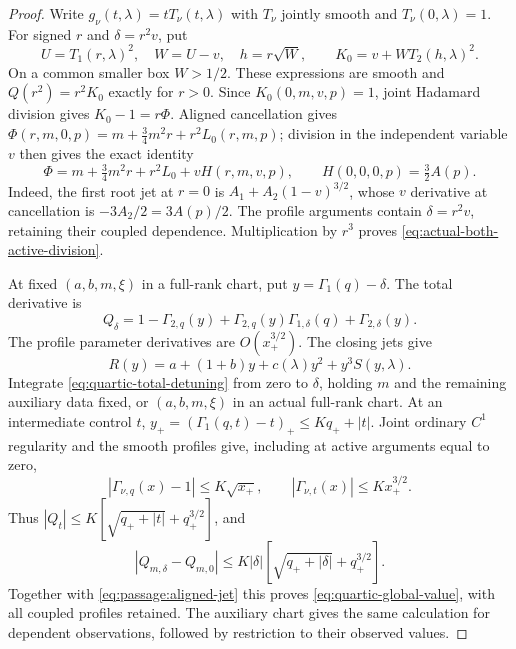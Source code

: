 \begin{proof}
Write $g_\nu(t,\lambda)=tT_\nu(t,\lambda)$ with $T_\nu$ jointly smooth
and $T_\nu(0,\lambda)=1$. For signed $r$ and $\delta=r^2v$, put
\[
 U=T_1(r,\lambda)^2,\quad W=U-v,\quad h=r\sqrt W,
 \qquad K_0=v+WT_2(h,\lambda)^2.
\]
On a common smaller box $W>1/2$. These expressions are smooth and
$Q(r^2)=r^2K_0$ exactly for $r>0$. Since $K_0(0,m,v,p)=1$,
joint Hadamard division gives $K_0-1=r\Phi$. Aligned cancellation gives
$\Phi(r,m,0,p)=m+\tfrac34m^2r+r^2L_0(r,m,p)$; division in the independent
variable $v$ then gives the exact identity
\begin{equation}\label{eq:quartic-Hadamard}
 \Phi=m+\tfrac34m^2r+r^2L_0+vH(r,m,v,p),
 \qquad H(0,0,0,p)=\tfrac32A(p).
\end{equation}
Indeed, the first root jet at $r=0$ is
$A_1+A_2(1-v)^{3/2}$, whose $v$ derivative at cancellation is
$-3A_2/2=3A(p)/2$. The profile arguments contain $\delta=r^2v$,
retaining their coupled dependence. Multiplication by $r^3$ proves
\eqref{eq:actual-both-active-division}.

At fixed $(a,b,m,\xi)$ in a full-rank chart, put
$y=\Gamma_1(q)-\delta$. The total derivative is
\begin{equation}\label{eq:quartic-total-detuning}
 Q_\delta=1-\Gamma_{2,q}(y)
 +\Gamma_{2,q}(y)\Gamma_{1,\delta}(q)+\Gamma_{2,\delta}(y).
\end{equation}
The profile parameter derivatives are $O(x_+^{3/2})$. The closing jets give
\begin{equation}\label{eq:quartic-closing-division}
 R(y)=a+(1+b)y+c(\lambda)y^2+y^3S(y,\lambda).
\end{equation}
Integrate \eqref{eq:quartic-total-detuning} from zero to $\delta$,
holding $m$ and the remaining auxiliary data fixed, or $(a,b,m,\xi)$
in an actual full-rank chart. At an intermediate control $t$,
$y_+=(\Gamma_1(q,t)-t)_+\le Kq_++|t|$. Joint ordinary $C^1$ regularity
and the smooth profiles give, including at active arguments equal to zero,
\[
 |\Gamma_{\nu,q}(x)-1|\le K\sqrt{x_+},\qquad
 |\Gamma_{\nu,t}(x)|\le Kx_+^{3/2}.
\]
Thus $|Q_t|\le K[\sqrt{q_++|t|}+q_+^{3/2}]$, and
\begin{equation}\label{eq:quartic-global-detuning}
 |Q_{m,\delta}-Q_{m,0}|
 \le K|\delta|[\sqrt{q_++|\delta|}+q_+^{3/2}].
\end{equation}
Together with \eqref{eq:passage:aligned-jet} this proves
\eqref{eq:quartic-global-value}, with all coupled profiles retained.
The auxiliary chart gives the same calculation for dependent observations,
followed by restriction to their observed values.
\end{proof}

